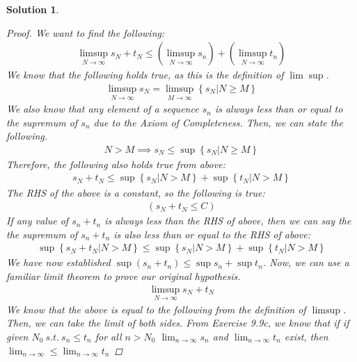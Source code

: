 \documentclass[12pt]{article}
\newtheorem{solution}{Solution}
\begin{document}
\begin{solution}
   \begin{proof}
    We want to find the following:
        \begin{align}
            \limsup_{N \to \infty} s_{N}+t_{N} \leq (\limsup_{N \to \infty} s_{n} )+(\limsup_{N \to \infty} t_{n} )
        \end{align} 
        We know that the following holds true, as this is the definition of $\lim\sup $.
        \begin{align}
           \limsup_{N \to \infty} s_{N} = \limsup_{M \to \infty}\left\{ s_{N} | N\geq M \right\} 
        \end{align}
        We also know that any element of a sequence $s_{n} $ is always less than or equal to the supremum of $s_{n} $ due to the Axiom of Completeness. Then, we can state the following. 
        \begin{align}
            N>M\implies s_{N} \leq \sup \left\{ s_{N} | N\geq M  \right\} 
        \end{align}
        Therefore, the following also holds true from above:
        \begin{align}
            s_{N} +t_{N} \leq \sup \left\{ s_{N} |N>M \right\} + \sup \left\{ t_{N} |N>M \right\} 
        \end{align}
        The RHS of the above is a constant, so the following is true:
        \begin{align}
            (s_{N} +t_{N} \leq C)
        \end{align}
        If any value of $s_{n} +t_{n} $ is always less than the RHS of above, then we can say the the supremum of $s_{n} +t_{n} $ is also less than or equal to the RHS of above:        \begin{align}
            \sup \left\{ s_{N} +t_{N} |N>M \right\} \leq \sup \left\{ s_{N} |N>M \right\} +\sup \left\{ t_{N} |N>M \right\} 
        \end{align}
        We have now established $\sup (s_{n} +t_{n})\leq \sup s_{n} +\sup t_{n} $. Now, we can use a familiar limit theorem to prove our original hypothesis.
        \begin{align}
           \limsup_{N \to \infty} s_{N} +t_{N}  
        \end{align}
        We know that the above is equal to the following from the definition of $\limsup$. Then, we can take the limit of both sides. From Exercise 9.9c, we know that if if given $N_{0}\ s.t. \ s_{n} \leq t_{n}  $ for all $n>N_0$  $\lim_{n \to \infty} s_{n} $ and $\lim_{n \to \infty} t_{n} $ exist, then $\lim_{n \to \infty}\leq \lim_{n \to \infty} t_{n}$

\end{proof}
\end{solution}
\end{document}
